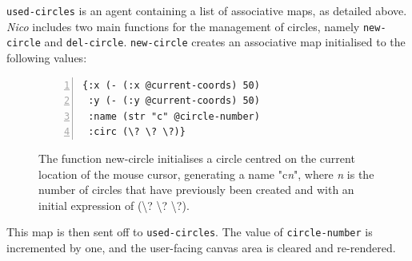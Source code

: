 \documentclass[12pt,twoside,notitlepage,xetex]{report}
\begin{document}
\verb¬used-circles¬ is an agent containing a list of associative maps, as
detailed above.  \emph{Nico} includes two main functions for the management of
circles, namely \verb¬new-circle¬ and \verb¬del-circle¬.  \verb¬new-circle¬
creates an associative map initialised to the following values:

\begin{center}
\begin{figure}[H]
\begin{center}
\begin{minipage}{2.5in}%
\begin{Verbatim}[fontsize=\small,numbers=left]
{:x (- (:x @current-coords) 50)
 :y (- (:y @current-coords) 50)
 :name (str "c" @circle-number)
 :circ (\? \? \?)}
\end{Verbatim}
\end{minipage}
\end{center}
\caption{The function {\ttfamily new-circle} initialises a circle centred on the current location of the mouse cursor, generating a name {\ttfamily "c}\emph{n}{\ttfamily "}, where \emph{n} is the number of circles that have previously been created and with an initial expression of {\ttfamily (\textbackslash? \textbackslash? \textbackslash?)}.}
\end{figure}
\end{center}

This map is then sent off to \verb¬used-circles¬.  The value of
\verb¬circle-number¬ is incremented by one, and the user-facing canvas area is
cleared and re-rendered.
\end{document}
